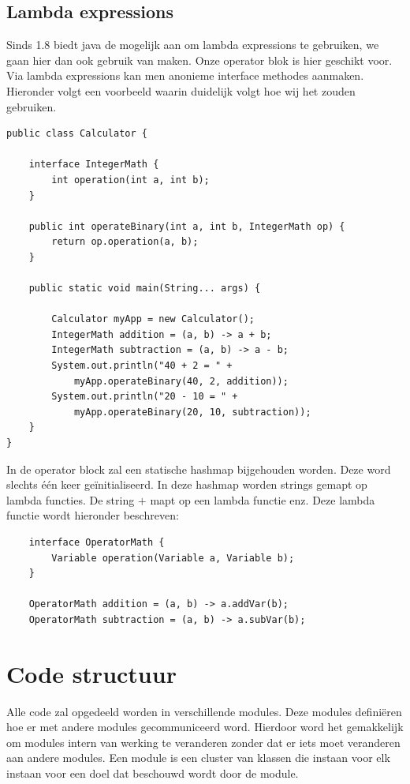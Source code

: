 \documentclass[]{article}
\begin{document}
\subsection{Lambda expressions}
\label{lambda}
Sinds 1.8 biedt java de mogelijk aan om lambda expressions \cite{lambda} te gebruiken, we gaan hier dan ook gebruik van maken. Onze operator blok is hier geschikt voor. Via lambda expressions kan men anonieme interface methodes aanmaken. Hieronder volgt een voorbeeld waarin duidelijk volgt hoe wij het zouden gebruiken. 
\lstset{language=Java}
\begin{lstlisting}
public class Calculator {
  
    interface IntegerMath {
        int operation(int a, int b);   
    }
  
    public int operateBinary(int a, int b, IntegerMath op) {
        return op.operation(a, b);
    }
 
    public static void main(String... args) {
    
        Calculator myApp = new Calculator();
        IntegerMath addition = (a, b) -> a + b;
        IntegerMath subtraction = (a, b) -> a - b;
        System.out.println("40 + 2 = " +
            myApp.operateBinary(40, 2, addition));
        System.out.println("20 - 10 = " +
            myApp.operateBinary(20, 10, subtraction));    
    }
}
\end{lstlisting}
In de operator block zal een statische hashmap bijgehouden worden. Deze word slechts \'{e}\'{e}n keer ge\"{i}nitialiseerd. In deze hashmap worden strings gemapt op lambda functies. De string $+$ mapt op een lambda functie enz. Deze lambda functie wordt hieronder beschreven:
\begin{lstlisting}
    interface OperatorMath {
        Variable operation(Variable a, Variable b);   
    }
  
    OperatorMath addition = (a, b) -> a.addVar(b);
    OperatorMath subtraction = (a, b) -> a.subVar(b);
\end{lstlisting}
\section{Code structuur}
Alle code zal opgedeeld worden in verschillende modules. Deze modules defini\"{e}ren hoe er met andere modules gecommuniceerd word. Hierdoor word het gemakkelijk om modules intern van werking te veranderen zonder dat er iets moet veranderen aan andere modules. Een module is een cluster van klassen die instaan voor elk instaan voor een doel dat beschouwd wordt door de module.
\end{document}
